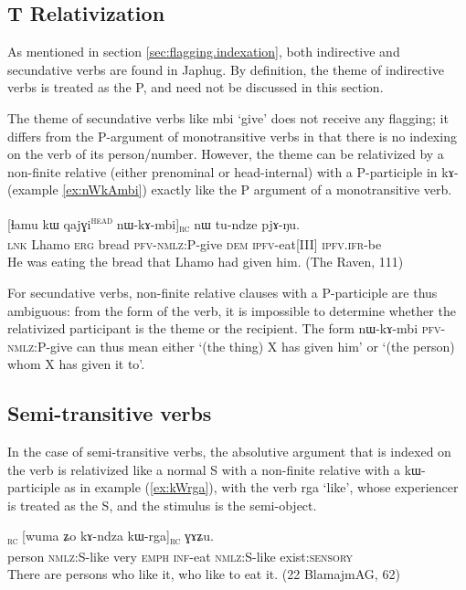 \documentclass[oldfontcommands,oneside,a4paper,11pt]{article}
\newcommand{\ipa}[1]{{\phon #1}} %
\newcommand{\topic}{\textsc{dem}}
\newcommand{\tete}{\textsuperscript{\textsc{head}}}
\newcommand{\rc}{\textsubscript{\textsc{rc}}}
\newcommand{\refb}[1]{(\ref{#1})}
\begin{document}
\subsection{T Relativization}
As mentioned in section \ref{sec:flagging.indexation}, both indirective and secundative verbs are found in Japhug. By definition, the theme of indirective verbs is treated as the P, and need not be discussed in this section.

The theme of secundative verbs like \ipa{mbi} `give' does not receive any flagging; it differs from the P-argument of monotransitive verbs in that there is no indexing on the verb of its person/number. However, the theme can be relativized by a non-finite relative (either prenominal or head-internal) with a P-participle in \ipa{kɤ}-  (example \ref{ex:nWkAmbi}) exactly like the P argument of a monotransitive verb. 

\begin{exe}
\ex \label{ex:nWkAmbi}
\gll      \ipa{tɕe} 	[\ipa{ɬamu} 	\ipa{kɯ} 	\ipa{qajɣi}\tete{} 	\ipa{nɯ-kɤ-mbi}]\rc{} 	\ipa{nɯ} 	\ipa{tu-ndze} 	\ipa{pjɤ-ŋu.}   \\
\textsc{lnk} Lhamo \textsc{erg} bread \textsc{pfv-nmlz}:P-give \topic{} \textsc{ipfv}-eat[III] \textsc{ipfv.ifr}-be  \\
 \glt    He was eating the bread that Lhamo had given him. (The Raven, 111)
\end{exe} 

For secundative verbs, non-finite relative clauses with a P-participle are thus ambiguous: from the form of the verb, it is impossible to determine whether the relativized participant is the theme or the recipient. The form \ipa{nɯ-kɤ-mbi} \textsc{pfv-nmlz}:P-give can thus mean either `(the thing) X has given him' or `(the person) whom X has given it to'.

\subsection{Semi-transitive verbs}
In the case of semi-transitive verbs, the absolutive argument that is indexed on the verb is relativized like a normal S with a non-finite relative with a \ipa{kɯ-} participle as in example \refb{ex:kWrga}, with the verb \ipa{rga} `like', whose experiencer is treated as the S, and the stimulus is the semi-object.

 \begin{exe}
   \ex   \label{ex:kWrga}
 \gll  [\textbf{\ipa{tɯrme}}\tete{}  	\ipa{kɯ-rga,}]\rc{}  	[\ipa{wuma}  	\ipa{ʑo}  	\ipa{kɤ-ndza}  	\ipa{kɯ-rga}]\rc{}  	\ipa{ɣɤʑu.} \\
person \textsc{nmlz:S}-like very \textsc{emph} \textsc{inf}-eat  \textsc{nmlz:S}-like exist:\textsc{sensory} \\
 \glt  There are persons who like it, who like to eat it. (22  BlamajmAG, 62)
   \end{exe} 
   
\end{document}
